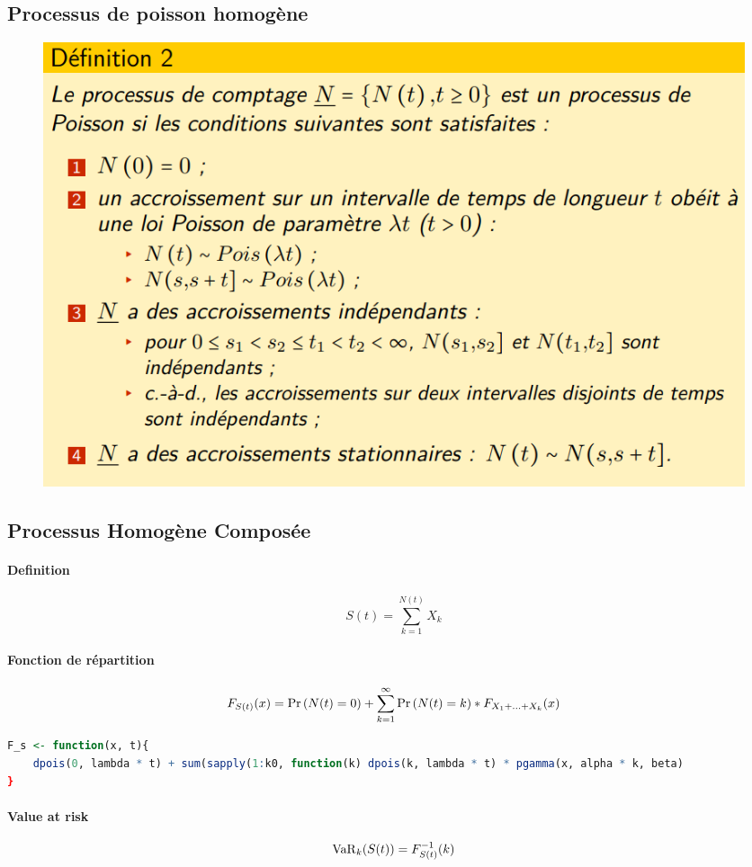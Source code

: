 \subsection{Processus de poisson homogène}
\begin{figure}
    \centering
    \includegraphics{src/TheorieDuRisque/Def-ProcessusPoissonHomogene.PNG}
\end{figure}

\subsection{Processus Homogène Composée}

\paragraph{Definition}
\[ S(t) = \sum_{k=1}^{N(t)} X_k \]

\paragraph{Fonction de répartition}
\[ F_{S(t)}(x) = \Pr \left( N(t) = 0 \right) + \sum_{k=1}^\infty \Pr \left( N(t) = k \right) * F_{X_1+...+X_k}(x) \]
\begin{lstlisting}[language=R, caption={Exemple Pois-Gamma}]
F_s <- function(x, t){
    dpois(0, lambda * t) + sum(sapply(1:k0, function(k) dpois(k, lambda * t) * pgamma(x, alpha * k, beta)
}
\end{lstlisting}

\paragraph{Value at risk}
\[ \mathrm{VaR}_{k}{\left( S(t) \right)} = F_{S(t)}^{-1}(k) \]

